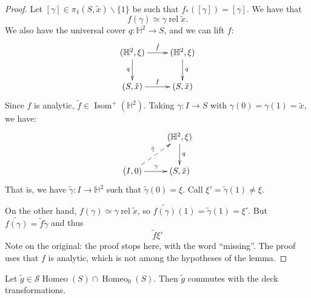 \begin{proof}
Let
$[\gamma]\in\pi_1(S,\tilde{x})
\backslash\{1\}$
be such that $f_*([\gamma])=[\gamma]$.
We have that
$$
f(\gamma)\simeq\gamma
\operatorname{rel}\tilde{x}.
$$
We also have the universal cover
$q:\mathbb{H}^2\to S$, and we can lift
$f$:
$$
\xymatrix{
(\mathbb{H}^2,\xi) \ar[r]^{\tilde{f}}
  \ar[d]_{q}
  & (\mathbb{H}^2,\xi) \ar[d]^{q} \\
(S,\tilde{x}) \ar[r]^{f}
  & (S,\tilde{x})
}
$$
Since $f$ is analytic,
$\tilde{f}\in
\operatorname{Isom}^+(\mathbb{H}^2)$.
Taking $\gamma:I\to S$ with
$\gamma(0)=\gamma(1)=\tilde{x}$, we
have:
$$
\xymatrix{
  & (\mathbb{H}^2,\xi) \ar[d]^{q} \\
(I,0) \ar[r]^{\gamma}
  \ar@{-->}[ur]^{\tilde{\gamma}}
  & (S,\tilde{x})
}
$$
That is, we have
$\tilde{\gamma}:I\to\mathbb{H}^2$ such
that $\tilde{\gamma}(0)=\xi$. Call
$\xi'=\tilde{\gamma}(1)\neq\xi$.

On the other hand,
$f(\gamma)\simeq\gamma
\operatorname{rel}\tilde{x}$,
so
$\widetilde{f(\gamma)}(1)
=\tilde{\gamma}(1)=\xi'$.
But
$\widetilde{f(\gamma)}
=\tilde{f}\tilde{\gamma}$
and thus
$$
\tilde{f}\xi'
$$
Note on the original: the proof stops
here, with the word ``missing''. The
proof uses that $f$ is analytic, which
is not among the hypotheses of the
lemma.
\end{proof}

\begin{lemma}
\label{lemma-commutes-with-deck}
Let
$\tilde{g}\in
\mathcal{S}\operatorname{Homeo}(S)
\cap\operatorname{Homeo}_0(S)$.
Then $\tilde{g}$ commutes with the deck
transformations.
\end{lemma}

